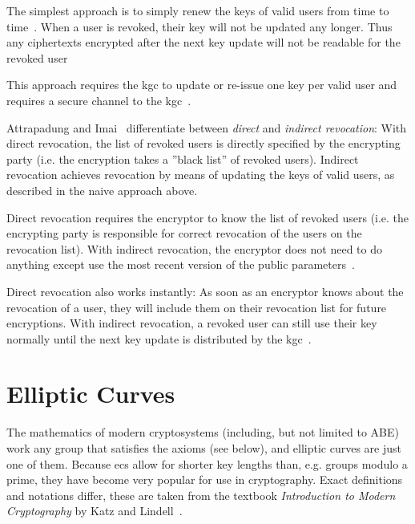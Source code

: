 The simplest approach is to simply renew the keys of valid users from time to time~\cite{boldyreva_identity-based_2008}.
When a user is revoked, their key will not be updated any longer. Thus any ciphertexts encrypted after the next key update will not be readable for the revoked user~\cite{boldyreva_identity-based_2008}

This approach requires the \acrshort{kgc} to update or re-issue one key per valid user and requires a secure channel to the \acrshort{kgc}~\cite{boldyreva_identity-based_2008}.

Attrapadung and Imai~\cite{attrapadung_attribute-based_2009} differentiate between \emph{direct} and \emph{indirect revocation}: 
With direct revocation, the list of revoked users is directly specified by the encrypting party (i.e. the encryption takes a ''black list'' of revoked users).
Indirect revocation achieves revocation by means of updating the keys of valid users, as described in the naive approach above.

Direct revocation requires the encryptor to know the list of revoked users \cite{attrapadung_attribute-based_2009} (i.e. the encrypting party is responsible for correct revocation of the users on the revocation list).
With indirect revocation, the encryptor does not need to do anything except use the most recent version of the public parameters~\cite{attrapadung_attribute-based_2009}.

Direct revocation also works instantly: As soon as an encryptor knows about the revocation of a user, they will include them on their revocation list for future encryptions.
With indirect revocation, a revoked user can still use their key normally until the next key update is distributed by the \acrshort{kgc}~\cite{attrapadung_attribute-based_2009}.



\section{Elliptic Curves}
\label{sec:ec}

The mathematics of modern cryptosystems (including, but not limited to ABE) work any group that satisfies the axioms (see below), and elliptic curves are just one of them.
Because \Glspl{ec} allow for shorter key lengths than, e.g. groups modulo a prime, they have become very popular for use in cryptography.
Exact definitions and notations differ, these are taken from the textbook \emph{Introduction to Modern Cryptography} by Katz and Lindell~\cite{katz_introduction_2015}.


